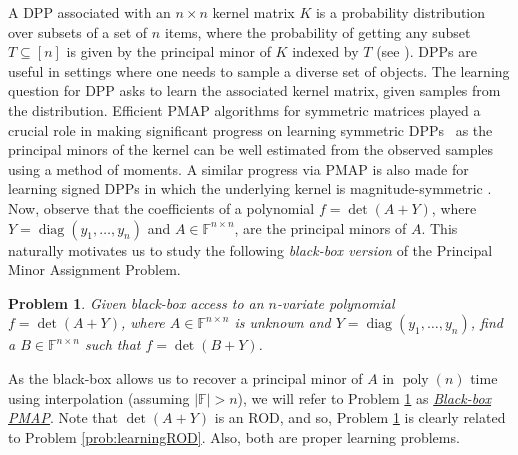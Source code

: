 \documentclass[11pt,letterpaper]{article}
\DeclareMathOperator*{\diag}{diag}
\newcommand{\F}{\mathbb{F}}
\newtheorem{problem}{Problem}[section]
\DeclareMathOperator*{\pol}{poly}
\begin{document}
A DPP associated with an $n\times n$ kernel matrix $K$ is a probability distribution over subsets of a set of $n$ items, where the probability of getting any subset $T\subseteq [n]$ is given by the principal minor of $K$ indexed by $T$ (see \cite{KuleszaTaskar2012}). 
DPPs are useful in settings where one needs to sample a diverse set of objects. The learning question for DPP asks to learn the associated kernel matrix, given samples from the distribution. Efficient PMAP algorithms for symmetric matrices \cite{Oeding2011-jo,RisingKuleszaTaskar2015} played a crucial role in making significant progress on learning symmetric DPPs~\cite{Urschel2017} as the principal minors of the kernel can be well estimated from the observed samples using a method of moments. A similar progress via PMAP is also made for learning signed DPPs in which the underlying kernel is magnitude-symmetric \cite{Brunel2018, BrunelUrschel2024}.   \\

Now, observe that the coefficients of a polynomial $f = \det(A + Y)$, where $Y = \diag(y_1, \ldots, y_n)$ and $A \in \F^{n \times n}$, are the principal minors of $A$. This naturally motivates us to study the following \emph{black-box version} of the Principal Minor Assignment Problem.   

\begin{problem} \label{prob:black-boxPMAP}
Given black-box access to an $n$-variate polynomial $f = \det(A + Y)$, where $A \in \F^{n \times n}$ is unknown and $Y = \diag(y_1, \ldots, y_n)$, find a $B \in \F^{n\times n}$ such that $f = \det(B + Y)$.
\end{problem}
As the black-box allows us to recover a principal minor of $A$ in $\pol(n)$ time using interpolation (assuming $|\F| > n$), we will refer to Problem \ref{prob:black-boxPMAP} as \underline{\emph{Black-box PMAP}}. Note that $\det(A + Y)$ is an ROD, and so, Problem \ref{prob:black-boxPMAP} is clearly related to Problem \ref{prob:learningROD}. Also, both are proper learning problems. 
\end{document}

